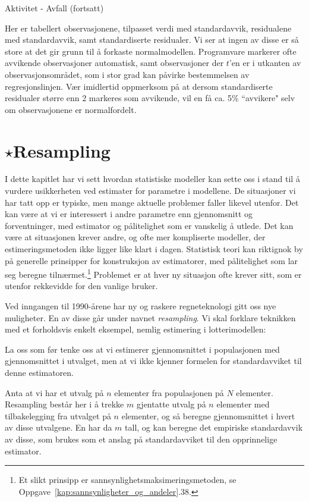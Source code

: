 \begin{eksempel}{Aktivitet - Avfall (fortsatt)}
\begin{center}
{\begin{minipage}{10.5cm}
\end{minipage}} \end{center}
Her er tabellert observasjonene, tilpasset verdi med standardavvik,
residualene med standardavvik, samt standardiserte residualer. 
Vi ser at ingen av disse er så store at det gir grunn til å forkaste
normalmodellen.  Programvare markerer ofte avvikende observasjoner automatisk,
samt observasjoner der $t$'en er i utkanten av observasjonsområdet, som 
i stor grad kan påvirke bestemmelsen av regresjonslinjen.
Vær imidlertid oppmerksom på at dersom standardiserte residualer
større enn 2 markeres som avvikende, vil en få ca. 5\% ``avvikere"
selv om observasjonene er normalfordelt.
\end{eksempel}

\section{$\star$Resampling}

I dette kapitlet har vi sett hvordan statistiske modeller kan sette oss i stand
til å vurdere usikkerheten ved estimater for parametre i modellene.
De situasjoner vi har tatt opp er typiske, men mange aktuelle problemer
faller likevel utenfor. Det kan være at vi er interessert i andre parametre
enn gjennomsnitt og forventninger, med estimator og pålitelighet som er
vanskelig å utlede. Det kan være at situasjonen krever andre,
og ofte mer kompliserte modeller, der estimeringsmetoden ikke ligger like
klart i dagen. Statistisk teori kan riktignok by på generelle prinsipper 
for konstruksjon av estimatorer, med pålitelighet som lar seg beregne
tilnærmet.\footnote{Et slikt prinsipp er sannsynlighetsmaksimeringsmetoden,
se Oppgave~\ref*{kap:sannsynligheter_og_andeler}.38.}
Problemet er at hver ny situasjon ofte krever sitt, som er utenfor rekkevidde
for den vanlige bruker.

Ved inngangen til 1990-årene har ny og raskere regneteknologi gitt oss nye
muligheter. En av disse går under navnet {\em resampling}. Vi skal forklare
teknikken med et forholdsvis enkelt eksempel, nemlig estimering i
lotterimodellen:

La oss som før tenke oss at vi estimerer gjennomsnittet i populasjonen med
gjennomsnittet i utvalget, men at vi ikke kjenner formelen for
standardavviket til denne estimatoren.

Anta at vi har et utvalg på $n$ elementer fra populasjonen på $N$
elementer. Resampling består her i å trekke $m$ gjentatte utvalg på
$n$ elementer med tilbakelegging fra utvalget på $n$ elementer, og så 
beregne gjennomsnittet i hvert av disse utvalgene. En har da $m$ tall, 
og kan beregne det empiriske standardavvik av disse, som brukes som et anslag 
på standardavviket til den opprinnelige estimator.

